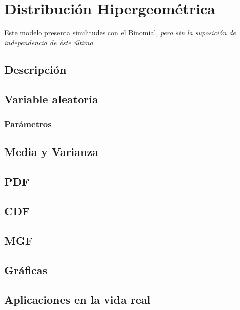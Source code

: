\chapter{Distribución Hipergeométrica}

Este modelo presenta similitudes con el Binomial, \textit{pero sin la suposición de independencia de éste último}.

\section{Descripción}

\section{Variable aleatoria}

\subsection{Parámetros}

\section{Media y Varianza}

\section{PDF}

\section{CDF}

\section{MGF}

\section{Gráficas}

\section{Aplicaciones en la vida real}

